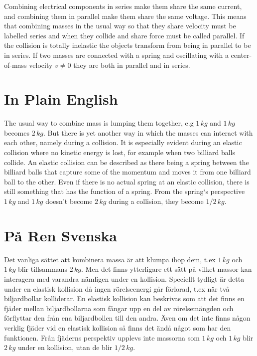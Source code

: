 Combining electrical components in series make them share the same current, and combining them in parallel make them share the same voltage.
This means that combining masses in the usual way so that they share velocity must be labelled series and when they collide and share force must be called parallel.
If the collision is totally inelastic the objects transform from being in parallel to be in series.
If two masses are connected with a spring and oscillating with a center-of-mass velocity $v \neq 0$ they are both in parallel and in series.

\appendix

\section{In Plain English}

The usual way to combine mass is lumping them together, e.g $1 \, kg$ and $1 \, kg$ becomes $2 \, kg$.
But there is yet another way in which the masses can interact with each other, namely during a collision.
It is especially evident during an elastic collision where no kinetic energy is lost, for example when two billiard balls collide.
An elastic collision can be described as there being a spring between the billiard balls that capture some of the momentum and moves it from one billiard ball to the other.
Even if there is no actual spring at an elastic collision, there is still something that has the function of a spring.
From the spring`s perspective $1 \, kg$ and $1 \, kg$ doesn’t become $2 \, kg$ during a collision, they become $1/2 \, kg$.

\section{På Ren Svenska}

Det vanliga sättet att kombinera massa är att klumpa ihop dem, t.ex $1 \, kg$ och $1 \, kg$ blir tillsammans $2 \, kg$.
Men det finns ytterligare ett sätt på vilket massor kan interagera med varandra nämligen under en kollision.
Speciellt tydligt är detta under en elastisk kollision då ingen rörelseenergi går förlorad, t.ex när två biljardbollar kolliderar.
En elastisk kollision kan beskrivas som att det finns en fjäder mellan biljardbollarna som fångar upp en del av rörelsemängden och förflyttar den från ena biljardbollen till den andra.
Även om det inte finns någon verklig fjäder vid en elastisk kollision så finns det ändå något som har den funktionen.
Från fjäderns perspektiv upplevs inte massorna som $1 \, kg$ och $1 \, kg$ blir $2 \, kg$ under en kollision, utan de blir $1/2 \, kg$.


